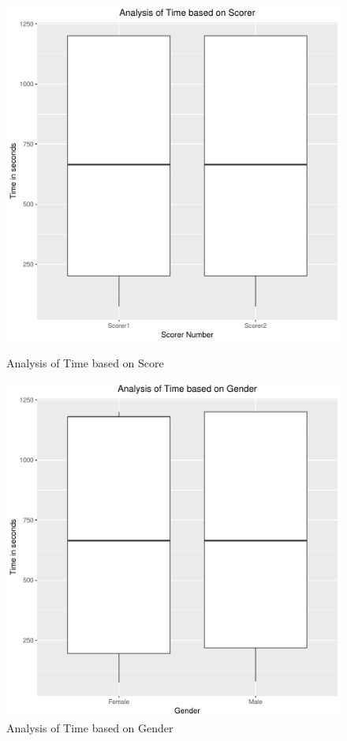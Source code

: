 \documentclass[12pt,epsf]{report}
\begin{document}
\\
\begin{figure}[!htb]
	\begin{minipage}[c]{0.5\linewidth}
	\includegraphics[width=\linewidth]{ScorerVsTime.pdf}
	\caption{Analysis of Time based on Score }
	\end{minipage}
	\hfill
	\begin{minipage}[c]{0.5\linewidth}
	\includegraphics[width=\linewidth]{GenderVsTime.pdf}
	\caption{Analysis of Time based on Gender}
	\end{minipage}
\end{figure}
\end{document}
